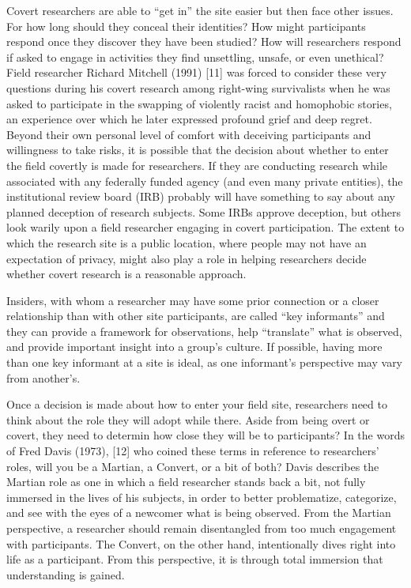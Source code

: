 Covert researchers are able to ``get in'' the site easier but then face other issues. For how long should they conceal their identities? How might participants respond once they discover they have been studied? How will researchers respond if asked to engage in activities they find unsettling, unsafe, or even unethical? Field researcher Richard Mitchell (1991) [11] was forced to consider these very questions during his covert research among right-wing survivalists when he was asked to participate in the swapping of violently racist and homophobic stories, an experience over which he later expressed profound grief and deep regret. Beyond their own personal level of comfort with deceiving participants and willingness to take risks, it is possible that the decision about whether to enter the field covertly is made for researchers. If they are conducting research while associated with any federally funded agency (and even many private entities), the institutional review board (IRB) probably will have something to say about any planned deception of research subjects. Some IRBs approve deception, but others look warily upon a field researcher engaging in covert participation. The extent to which the research site is a public location, where people may not have an expectation of privacy, might also play a role in helping researchers decide whether covert research is a reasonable approach.

Insiders, with whom a researcher may have some prior connection or a closer relationship than with other site participants, are called ``key informants'' and they can provide a framework for observations, help ``translate'' what is observed, and provide important insight into a group’s culture. If possible, having more than one key informant at a site is ideal, as one informant’s perspective may vary from another’s.

Once a decision is made about how to enter your field site, researchers need to think about the role they will adopt while there. Aside from being overt or covert, they need to determin how close they will be to participants? In the words of Fred Davis (1973), [12] who coined these terms in reference to researchers’ roles, will you be a Martian, a Convert, or a bit of both? Davis describes the Martian role as one in which a field researcher stands back a bit, not fully immersed in the lives of his subjects, in order to better problematize, categorize, and see with the eyes of a newcomer what is being observed. From the Martian perspective, a researcher should remain disentangled from too much engagement with participants. The Convert, on the other hand, intentionally dives right into life as a participant. From this perspective, it is through total immersion that understanding is gained. 

